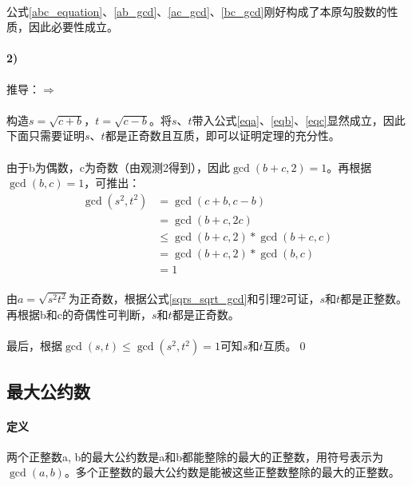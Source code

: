 \documentclass[UTF8]{ctexart}
\begin{document}
	\paragraph{} 公式\ref{abc_equation}、\ref{ab_gcd}、\ref{ac_gcd}、\ref{bc_gcd}刚好构成了本原勾股数的性质，因此必要性成立。

	\paragraph{2)} 推导：$\Rightarrow$
	\paragraph{} 构造$s=\sqrt{c+b}$，$t=\sqrt{c-b}$。将$s$、$t$带入公式\ref{eqa}、\ref{eqb}、\ref{eqc}显然成立，因此下面只需要证明$s$、$t$都是正奇数且互质，即可以证明定理的充分性。
	\paragraph{} 由于b为偶数，c为奇数（由观测2得到），因此$\gcd(b+c,2)=1$。再根据$\gcd(b,c)=1$，可推出：
	\begin{equation}\label{sqrs_sqrt_gcd}
		\begin{aligned}
			\gcd(s^2,t^2)&=\gcd(c+b,c-b)\\
			             &=\gcd(b+c,2c)\\
			             &{\leq}\gcd(b+c,2)*\gcd(b+c,c)\\
						 &=\gcd(b+c,2)*\gcd(b,c)\\
						 &=1
		\end{aligned}
	\end{equation}
	\paragraph{} 由$a=\sqrt{s^2t^2}$为正奇数，根据公式\ref{sqrs_sqrt_gcd}和引理2可证，$s$和$t$都是正整数。再根据b和c的奇偶性可判断，$s$和$t$都是正奇数。
	\paragraph{} 最后，根据$\gcd(s,t){\leq}\gcd(s^2,t^2)=1$可知$s$和$t$互质。\qed	
    \subsection{最大公约数}
    \paragraph{定义} 两个正整数a, b的最大公约数是a和b都能整除的最大的正整数，用符号表示为$\gcd(a,b)$。多个正整数的最大公约数是能被这些正整数整除的最大的正整数。
\end{document}
